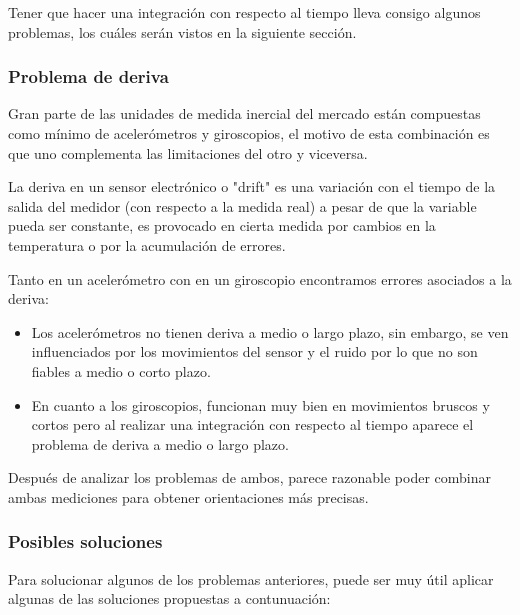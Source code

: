 Tener que hacer una integración con respecto al tiempo lleva consigo algunos problemas, los cuáles serán vistos en la siguiente sección. 

\subsubsection{Problema de deriva}

Gran parte de las unidades de medida inercial del mercado están compuestas como mínimo de acelerómetros y giroscopios, el motivo de esta combinación es que uno complementa las limitaciones del otro y viceversa. \newline

La deriva en un sensor electrónico o "drift" es una variación con el tiempo de la salida del medidor (con respecto a la medida real) a pesar de que la variable pueda ser constante, es provocado en cierta medida por cambios en la temperatura o por la acumulación de errores. \newline

Tanto en un acelerómetro con en un giroscopio encontramos errores asociados a la deriva: 
\begin{itemize}
	\item Los acelerómetros no tienen deriva a medio o largo plazo, sin embargo, se ven influenciados por los movimientos del sensor y el ruido por lo que no son fiables a medio o corto plazo.
	\item En cuanto a los giroscopios, funcionan muy bien en movimientos bruscos y cortos pero al realizar una integración con respecto al tiempo aparece el problema de deriva a medio o largo plazo. 
\end{itemize} 

Después de analizar los problemas de ambos, parece razonable poder combinar ambas mediciones para obtener orientaciones más precisas. 

\subsubsection{Posibles soluciones}

Para solucionar algunos de los problemas anteriores, puede ser muy útil aplicar algunas de las soluciones propuestas a contunuación: 

